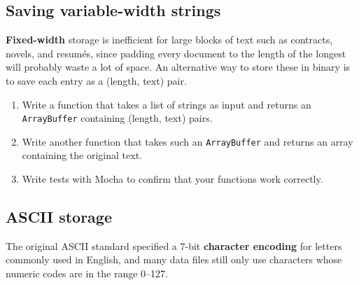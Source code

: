 \documentclass[krantzl]{krantz}
\newcommand{\glossref}[1]{\textbf{#1}}
\begin{document}
\subsection*{Saving variable-width strings}


\glossref{Fixed-width} storage is inefficient for large blocks of text
such as contracts, novels, and resumés,
since padding every document to the length of the longest will probably waste a lot of space.
An alternative way to store these in binary is to save each entry as a (length, text) pair.

\begin{enumerate}

\item 

Write a function that takes a list of strings as input
    and returns an \texttt{ArrayBuffer} containing (length, text) pairs.



\item 

Write another function that takes such an \texttt{ArrayBuffer}
    and returns an array containing the original text.



\item 

Write tests with Mocha to confirm that your functions work correctly.



\end{enumerate}

\subsection*{ASCII storage}


The original ASCII standard specified
a 7-bit \glossref{character encoding} for letters commonly used in English,
and many data files still only use characters whose numeric codes are in the range 0–127.
\end{document}
